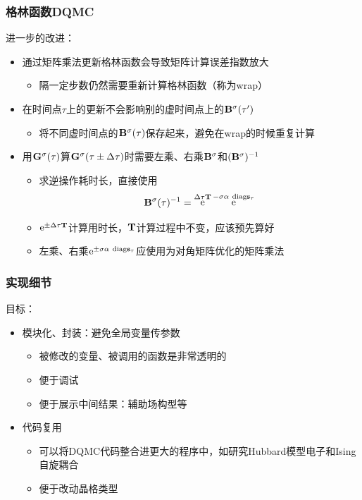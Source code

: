 \documentclass[UTF8]{ctexbeamer}
\DeclareMathOperator{\ee}{e}
\begin{document}
\begin{frame}
\frametitle{格林函数DQMC}

进一步的改进：
\begin{itemize}
    \item 通过矩阵乘法更新格林函数会导致矩阵计算误差指数放大
    \begin{itemize}
        \item 隔一定步数仍然需要重新计算格林函数（称为wrap）
    \end{itemize}
    \item 在时间点$\tau$上的更新不会影响别的虚时间点上的$\vb{B}^\sigma(\tau')$
    \begin{itemize}
        \item 将不同虚时间点的$\vb{B}^\sigma(\tau)$保存起来，避免在wrap的时候重复计算
    \end{itemize}
    \item 用$\vb{G}^\sigma(\tau)$算$\vb{G}^\sigma(\tau \pm \Delta \tau)$时需要左乘、右乘$\vb{B}^\sigma$和$(\vb{B}^\sigma)^{-1}$
    \begin{itemize}
        \item 求逆操作耗时长，直接使用
        \begin{equation}
            \vb{B}^\sigma(\tau)^{-1} = \ee^{\Delta \tau \vb{T}} \ee^{-\sigma \alpha \ \mathrm{diag}{\vb{s}_\tau}}
        \end{equation}
        \item $\ee^{\pm \Delta \tau \vb{T}}$计算用时长，$\vb{T}$计算过程中不变，应该预先算好
        \item 左乘、右乘$\ee^{\pm \sigma \alpha\ \mathrm{diag} \vb{s}_\tau}$应使用为对角矩阵优化的矩阵乘法
    \end{itemize}
\end{itemize}

\end{frame}

\begin{frame}
\frametitle{实现细节}

目标：
\begin{itemize}
    \item 模块化、封装：避免全局变量传参数
    \begin{itemize}
        \item 被修改的变量、被调用的函数是非常透明的
        \item 便于调试
        \item 便于展示中间结果：辅助场构型等
    \end{itemize}
    \item 代码复用
    \begin{itemize}
        \item 可以将DQMC代码整合进更大的程序中，如研究Hubbard模型电子和Ising自旋耦合
        \item 便于改动晶格类型
    \end{itemize}
\end{itemize}    

\end{frame}
\end{document}
